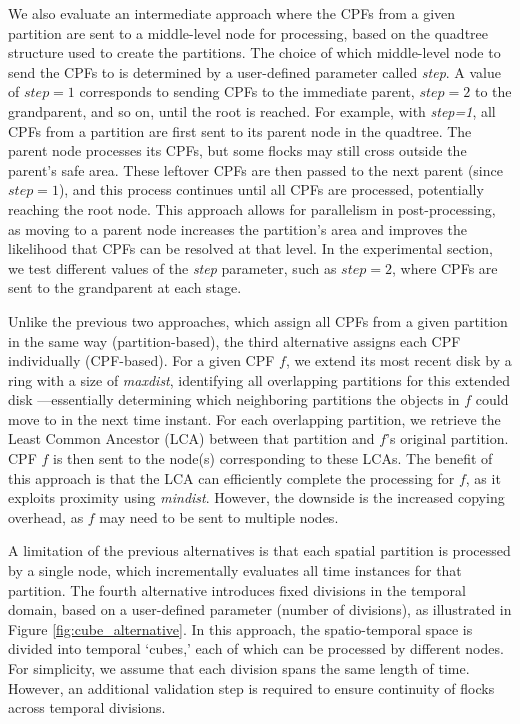 We also evaluate an intermediate approach where the CPFs from a given partition are sent to a middle-level node for processing, based on the quadtree structure used to create the partitions. The choice of which middle-level node to send the CPFs to is determined by a user-defined parameter called \textit{step}. A value of $step = 1$ corresponds to sending CPFs to the immediate parent, $step = 2$ to the grandparent, and so on, until the root is reached. For example, with \textit{step=1}, all CPFs from a partition are first sent to its parent node in the quadtree. The parent node processes its CPFs, but some flocks may still cross outside the parent's safe area.  These leftover CPFs are then passed to the next parent (since $step = 1$), and this process continues until all CPFs are processed, potentially reaching the root node. This approach allows for parallelism in post-processing, as moving to a parent node increases the partition's area and improves the likelihood that CPFs can be resolved at that level. In the experimental section, we test different values of the \textit{step} parameter, such as $step=2$, where CPFs are sent to the grandparent at each stage.

Unlike the previous two approaches, which assign all CPFs from a given partition in the same way (partition-based), the third alternative assigns each CPF individually (CPF-based). For a given CPF $f$, we extend its most recent disk by a ring with a size of \textit{maxdist}, identifying all overlapping partitions for this extended disk —essentially determining which neighboring partitions the objects in $f$ could move to in the next time instant. For each overlapping partition, we retrieve the Least Common Ancestor (LCA) between that partition and $f$'s original partition. CPF $f$ is then sent to the node(s) corresponding to these LCAs. The benefit of this approach is that the LCA can efficiently complete the processing for $f$, as it exploits proximity using \textit{mindist}. However, the downside is the increased copying overhead, as $f$ may need to be sent to multiple nodes.

A limitation of the previous alternatives is that each spatial partition is processed by a single node, which incrementally evaluates all time instances for that partition. The fourth alternative introduces fixed divisions in the temporal domain, based on a user-defined parameter (number of divisions), as illustrated in Figure \ref{fig:cube_alternative}. In this approach, the spatio-temporal space is divided into temporal `cubes,' each of which can be processed by different nodes. For simplicity, we assume that each division spans the same length of time. However, an additional validation step is required to ensure continuity of flocks across temporal divisions.

